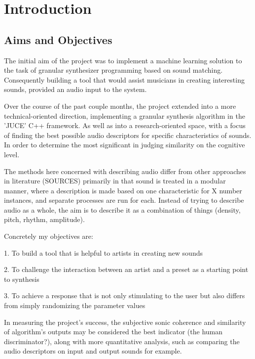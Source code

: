 \chapter{Introduction}
\label{chapterlabel1}

\section{Aims and Objectives}
The initial aim of the project was to implement a machine learning solution to
the task of granular synthesizer programming based on sound matching.
Consequently building a tool that would assist musicians in creating interesting
sounds, provided an audio input to the system.

Over the course of the past couple months, the project extended into a more
technical-oriented direction, implementing a granular synthesis algorithm in the
'JUCE' C++ framework. As well as into a research-oriented space, with a focus of
finding the best possible audio descriptors for specific characteristics of
sounds. In order to determine the most significant in judging similarity on the
cognitive level.

The methods here concerned with describing audio differ from other approaches in
literature
(SOURCES)%
primarily in that sound is treated in a modular manner,
where a description is made based on one characteristic for X number instances,
and separate processes are run for each. Instead of trying to describe audio as
a whole, the aim is to describe it as a combination of things (density, pitch,
rhythm, amplitude).

Concretely my objectives are:

1. To build a tool that is helpful to artists in creating new sounds 

2. To challenge the interaction between an artist and a preset as a starting
point to synthesis 

3. To achieve a response that is not only stimulating to the user but also differs
from simply randomizing the parameter values 

In measuring the project's success, the subjective sonic coherence and
similarity of algorithm's outputs may be considered the best indicator (the
human discriminator?), along with more quantitative analysis, such as comparing
the audio descriptors on input and output sounds for example.

